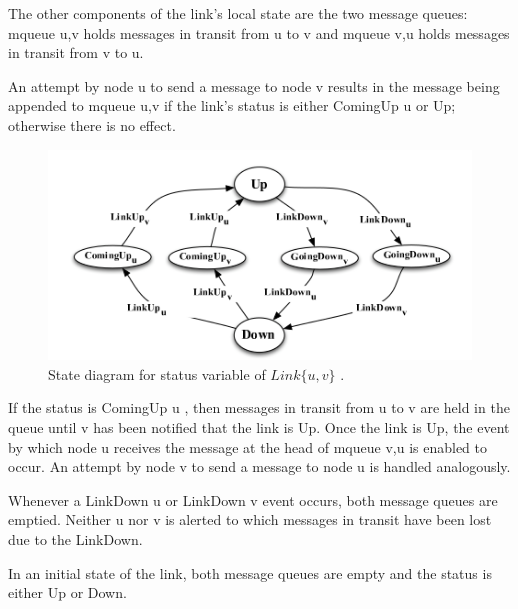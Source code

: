 The other components of the link’s local state are the two message queues: mqueue u,v holds messages in transit from u to v and mqueue v,u holds messages in transit from v to u.

An attempt by node u to send a message to node v results in the message being appended to mqueue u,v if the link’s status is either ComingUp u or Up; otherwise there is no effect.
\begin{figure}[hbtp]
\centering
\includegraphics[scale=.75]{screenshot.png}
\caption{State diagram for status variable of $Link\lbrace u, v\rbrace$ .}
\end{figure}

If the status is ComingUp u , then messages in transit from u to v are held in the queue until v has been notified that the link is Up. Once the link is Up, the event by which node u receives the message at the head of mqueue v,u is enabled to occur. An attempt by node v to send a message to node u is handled analogously.

Whenever a LinkDown u or LinkDown v event occurs, both message queues are emptied. Neither u nor v is alerted to which messages in transit have been lost due to the LinkDown.

In an initial state of the link, both message queues are empty and the status is either Up or Down.
